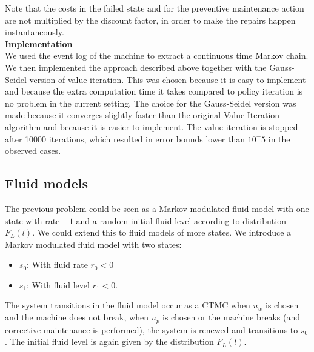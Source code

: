 Note that the costs in the failed state and for the preventive maintenance action are not multiplied by the discount factor, in order to make the repairs happen instantaneously.\\
\textbf{Implementation}\\
We used the event log of the machine to extract a continuous time Markov chain. We then implemented the approach described above together with the Gauss-Seidel version of value iteration\citep{Bertsekas1995}. This was chosen because it is easy to implement and because the extra computation time it takes compared to policy iteration is no problem in the current setting. The choice for the Gauss-Seidel version was made because it converges slightly faster than the original Value Iteration algorithm and because it is easier to implement. The value iteration is stopped after 10000 iterations, which resulted in error bounds lower than $10^-5$ in the observed cases.

\subsection{Fluid models}
The previous problem could be seen as a Markov modulated fluid model with one state with rate $-1$ and a random initial fluid level according to distribution $F_L(l)$. We could extend this to fluid models of more states.
We introduce a Markov modulated fluid model with two states: 
\begin{itemize}
\item $s_0$: With fluid rate $r_0<0$
\item $s_1$: With fluid level $r_1<0$.
\end{itemize}
The system transitions in the fluid model occur as a CTMC when $u_w$ is chosen and the machine does not break, when $u_p$ is chosen or the machine breaks (and corrective maintenance is performed), the system is renewed and transitions to $s_0$. The initial fluid level is again given by the distribution $F_L(l)$.\\

